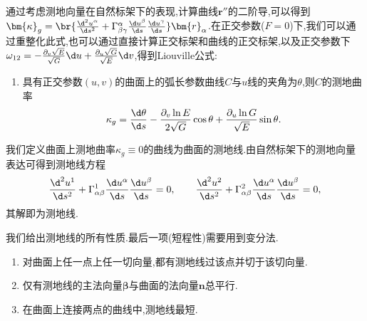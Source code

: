 \documentclass{article}
\begin{document}
通过考虑测地向量在自然标架下的表现,计算曲线$\bm{r}''$的二阶导,可以得到$\bm{\kappa}_g=\br{\frac{\d^2 u^\alpha}{\d s^2}+\Gamma^\alpha_{\beta\gamma}\frac{\d u^\beta}{\d s}\frac{\d u^\gamma}{\d s}}\bm{r}_\alpha$.在正交参数($F=0$)下,我们可以通过重整化此式,也可以通过直接计算正交标架和曲线的正交标架,以及正交参数下$\omega_{12}=-\frac{\partial_v\sqrt{E}}{\sqrt{G}}\d u+\frac{\partial_u\sqrt{G}}{\sqrt{E}}\d v$,得到Liouville公式:
\begin{enumerate}
    \item 具有正交参数$(u,v)$的曲面上的弧长参数曲线$C$与$u$线的夹角为$\theta$,则$C$的测地曲率
    $$\kappa_g=\frac{\d \theta}{\d s}-\frac{\partial_v\ln E}{2\sqrt{G}}\cos \theta+\frac{\partial_u\ln G}{\sqrt{E}}\sin \theta.$$
\end{enumerate}

我们定义曲面上测地曲率$\kappa_g\equiv 0$的曲线为曲面的测地线.由自然标架下的测地向量表达可得到测地线方程
$$\frac{\d^2 u^1}{\d s^2}+\Gamma^1_{\alpha\beta}\frac{\d u^\alpha}{\d s}\frac{\d u^\beta}{\d s}=0,\qquad \frac{\d^2 u^2}{\d s^2}+\Gamma^2_{\alpha\beta}\frac{\d u^\alpha}{\d s}\frac{\d u^\beta}{\d s}=0,$$
其解即为测地线.

我们给出测地线的所有性质.最后一项(短程性)需要用到变分法.
\begin{enumerate}[resume]
    \item 对曲面上任一点上任一切向量,都有测地线过该点并切于该切向量.
    \item 仅有测地线的主法向量$\bm{\beta}$与曲面的法向量$\bm{n}$总平行.
    \item 在曲面上连接两点的曲线中,测地线最短.
\end{enumerate}
\end{document}
